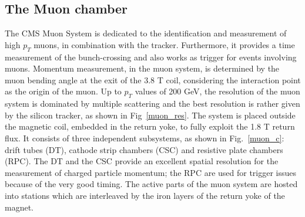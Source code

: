 \subsection*{The Muon chamber}
The CMS Muon System  is dedicated to the identification and measurement of high
$p_T$ muons, in combination with the tracker. Furthermore, it provides a time measurement
of the bunch-crossing and also works as trigger for events involving muons. Momentum
measurement, in the muon system, is determined by the muon bending angle at the exit
of the 3.8 T coil, considering the interaction point as the origin of the muon. Up to $p_T$
values of 200 GeV, the resolution of the muon system is dominated by multiple scattering
and the best resolution is rather given by the silicon tracker, as
shown in Fig~\ref{muon_res}. The system is placed outside
the magnetic coil, embedded in the return yoke, to fully exploit the 1.8 T return flux. It
consists of three independent subsystems, as shown in Fig.~\ref{muon_c}: drift tubes (DT), cathode strip chambers (CSC) and resistive plate
chambers (RPC). The DT and the CSC provide an excellent spatial resolution for the
measurement of charged particle momentum; the RPC are used for trigger issues because
of the very good timing. The active parts of the muon system are hosted into stations
which are interleaved by the iron layers of the return yoke of the magnet. 

